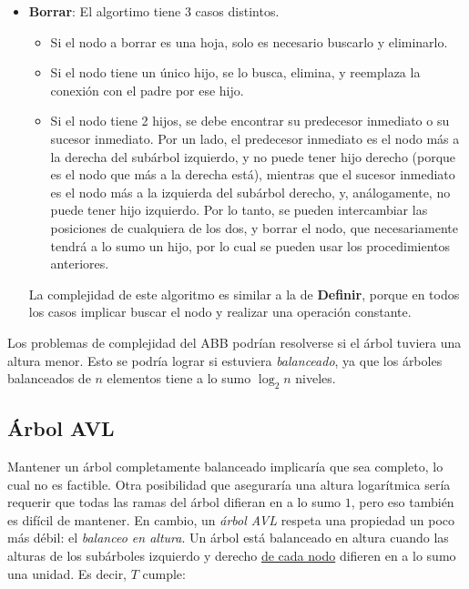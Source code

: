 \documentclass{article}
\begin{document}
\begin{itemize}
    \item \textbf{Borrar}: El algortimo tiene 3 casos distintos.
          \begin{itemize}
              \item Si el nodo a borrar es una hoja, solo es necesario buscarlo y eliminarlo.
              \item Si el nodo tiene un único hijo, se lo busca, elimina, y reemplaza la conexión con el padre por ese hijo.
              \item Si el nodo tiene 2 hijos, se debe encontrar su predecesor inmediato o su sucesor inmediato. Por un lado, el predecesor inmediato es el nodo más a la derecha del subárbol izquierdo, y no puede tener hijo derecho (porque es el nodo que más a la derecha está), mientras que el sucesor inmediato es el nodo más a la izquierda del subárbol derecho, y, análogamente, no puede tener hijo izquierdo. Por lo tanto, se pueden intercambiar las posiciones de cualquiera de los dos, y borrar el nodo, que necesariamente tendrá a lo sumo un hijo, por lo cual se pueden usar los procedimientos anteriores.
          \end{itemize}

          La complejidad de este algoritmo es similar a la de \textbf{Definir}, porque en todos los casos implicar buscar el nodo y realizar una operación constante.

\end{itemize}

Los problemas de complejidad del ABB podrían resolverse si el árbol tuviera una altura menor. Esto se podría lograr si estuviera \textit{balanceado}, ya que los árboles balanceados de $n$ elementos tiene a lo sumo $\log_2{n}$ niveles.

\subsection{Árbol AVL}
\label{subsec-avl}

Mantener un árbol completamente balanceado implicaría que sea completo, lo cual no es factible. Otra posibilidad que aseguraría una altura logarítmica sería requerir que todas las ramas del árbol difieran en a lo sumo $1$, pero eso también es difícil de mantener. En cambio, un \textit{árbol AVL} respeta una propiedad un poco más débil: el \textit{balanceo en altura}. Un árbol está balanceado en altura cuando las alturas de los subárboles izquierdo y derecho \underline{de cada nodo} difieren en a lo sumo una unidad. Es decir, $T$ cumple:
\end{document}
